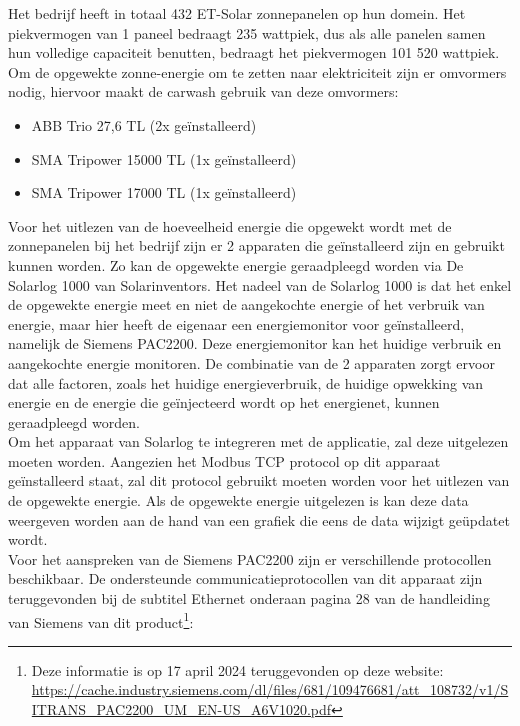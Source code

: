 Het bedrijf heeft in totaal 432 ET-Solar zonnepanelen op hun domein. Het piekvermogen van 1 paneel bedraagt 235 wattpiek, dus als alle panelen samen hun volledige capaciteit benutten, bedraagt het piekvermogen 101 520 wattpiek. Om de opgewekte zonne-energie om te zetten naar elektriciteit zijn er omvormers nodig, hiervoor maakt de carwash gebruik van deze omvormers:

\begin{itemize}
    \item ABB Trio 27,6 TL (2x geïnstalleerd)
    \item SMA Tripower 15000 TL (1x geïnstalleerd)
    \item SMA Tripower 17000 TL (1x geïnstalleerd)
\end{itemize}

Voor het uitlezen van de hoeveelheid energie die opgewekt wordt met de zonnepanelen bij het bedrijf zijn er 2 apparaten die geïnstalleerd zijn en gebruikt kunnen worden. Zo kan de opgewekte energie geraadpleegd worden via De Solarlog 1000 van Solarinventors. Het nadeel van de Solarlog 1000 is dat het enkel de opgewekte energie meet en niet de aangekochte energie of het verbruik van energie, maar hier heeft de eigenaar een energiemonitor voor geïnstalleerd, namelijk de Siemens PAC2200. Deze energiemonitor kan het huidige verbruik en aangekochte energie monitoren. De combinatie van de 2 apparaten zorgt ervoor dat alle factoren, zoals het huidige energieverbruik, de huidige opwekking van energie en de energie die geïnjecteerd wordt op het energienet, kunnen geraadpleegd worden.\\

Om het apparaat van Solarlog te integreren met de applicatie, zal deze uitgelezen moeten worden. Aangezien het Modbus TCP protocol op dit apparaat geïnstalleerd staat, zal dit protocol gebruikt moeten worden voor het uitlezen van de opgewekte energie. Als de opgewekte energie uitgelezen is kan deze data weergeven worden aan de hand van een grafiek die eens de data wijzigt geüpdatet wordt.\\

Voor het aanspreken van de Siemens PAC2200 zijn er verschillende protocollen beschikbaar. De ondersteunde communicatieprotocollen van dit apparaat zijn teruggevonden bij de subtitel Ethernet onderaan pagina 28 van de handleiding van Siemens van dit product\footnote{Deze informatie is op 17 april 2024 teruggevonden op deze website: \url{https://cache.industry.siemens.com/dl/files/681/109476681/att_108732/v1/SITRANS_PAC2200_UM_EN-US_A6V1020.pdf}}:

